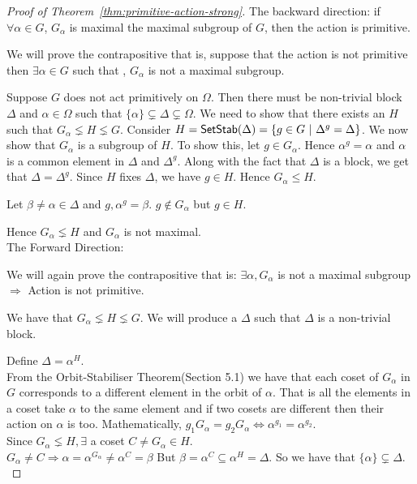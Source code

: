 \begin{proof}[Proof of Theorem~\ref{thm:primitive-action-strong}]

The backward direction: if $\forall \alpha \in G$, $G_\alpha$ is maximal the
maximal subgroup of $G$, then the action is primitive.

We will prove the contrapositive that is, suppose that the action is not 
primitive then $\exists \alpha \in G$ such that , $G_\alpha$ is not a maximal 
subgroup.

Suppose $G$ does not act primitively on $\Omega$. Then there must be
non-trivial block $\Delta$ and $\alpha \in \Omega$ such that $\{\alpha\}
\subsetneq \Delta \subsetneq \Omega$. We need to show that there exists an $H$
such that $G_\alpha \lneq H \lneq G$. Consider $H = {\sf SetStab}(\Delta) = \{g \in
G ~|~ \Delta^g =\Delta \}$. We now show that $G_\alpha$ is a subgroup of $H$.
To show this, let $g \in G_\alpha$. Hence $\alpha^g = \alpha$ and $\alpha$ is
a common element in $\Delta$ and $\Delta^g$. Along with the fact that $\Delta$
is a block, we get that $\Delta = \Delta^g$. Since $H$ fixes $\Delta$, we have
$g \in H$.  Hence $G_\alpha \leq H$. 

Let $\beta \neq \alpha \in \Delta$ and $g, \alpha^g = \beta$. $g \notin G_\alpha$ but $g \in H$. 

Hence $G_\alpha \lneq H$ and $G_\alpha$ is not maximal. \\

The Forward Direction:

We will again prove the contrapositive that is: $\exists \alpha, G_\alpha$ is not a maximal subgroup $\Rightarrow$ Action is not primitive.

We have that $G_\alpha \lneq H \lneq G$. We will produce a $\Delta$ such that $\Delta$ is a non-trivial block.


Define $\Delta = \alpha^H$. \\

From the Orbit-Stabiliser Theorem(Section 5.1) we have that each coset of $G_\alpha$ in $G$ corresponds to a different element in the orbit of $\alpha$. That is all the elements in a coset take $\alpha$ to the same element and if two cosets are different then their action on $\alpha$ is too. Mathematically, $g_1G_\alpha = g_2G_\alpha \Leftrightarrow \alpha^{g_1} = \alpha^{g_2}$.\\

Since $G_\alpha \lneq H,\exists$ a coset $C \neq G_\alpha \in H$. \\$G_\alpha \neq C \Rightarrow \alpha = \alpha^{G_\alpha} \not = \alpha^C = \beta$ But $\beta = \alpha^C \subseteq \alpha^H = \Delta$. So we have that $\{\alpha\} \subsetneq \Delta$. \\


\end{proof}
